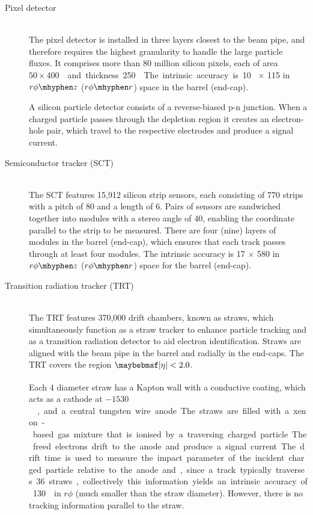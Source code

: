 \begin{description}
\item[Pixel detector] \hfill \\
	The pixel detector is installed in three layers closest to the beam pipe, and 
	therefore requires the highest granularity to handle the large particle fluxes.
	It comprises more than 80 million silicon pixels, each of area 
	\unit{$50 \times 400$}{\micro\metre\squared} and thickness \unit{250}{\micro\metre}. 
	The intrinsic accuracy is \unit{10}{\micro\metre}$\,\times\,$\unit{115}{\micro\metre} 
	in $r\phi \mhyphen z$ ($r\phi \mhyphen r$) space in the barrel (end-cap).

	A silicon particle detector consists of a reverse-biased p-n junction. When a charged
	particle passes through the depletion region it creates an electron-hole pair, which 
	travel to the respective electrodes and produce a signal current.
\item[Semiconductor tracker (SCT)] \hfill \\
	The SCT features 15,912 silicon strip sensors, each consisting of 770 strips 
	with a pitch of \unit{80}{\micro\metre} and a length of \unit{6}{\centi\metre}. Pairs 
	of sensors are sandwiched together into modules with a stereo angle of 
	\unit{40}{\milli\radian}, enabling the coordinate parallel to the strip to be 
	measured. There are four (nine) layers of modules in the barrel (end-cap), which 
	ensures that each track passes through at least four modules. 
	The intrinsic accuracy is \unit{17}{\micro\metre}$\,\times\,$\unit{580}{\micro\metre} 
	in $r\phi \mhyphen z$ ($r\phi \mhyphen r$) space for the barrel (end-cap).
\item[Transition radiation tracker (TRT)] \hfill \\
	The TRT features 370,000 drift chambers, known as straws, which simultaneously 
	function as a straw tracker to enhance particle tracking and as a transition 
	radiation detector to aid electron identification. Straws are aligned with the beam 
	pipe in the barrel and radially in the end-caps. The TRT covers the region 
	$\mods{\eta} < 2.0$.

	Each \unit{4}{\milli\metre} diameter straw has a 
	Kapton\textsuperscript{\circledR}\xspace wall with a conductive coating, which 
	acts as a cathode at \unit{$-1530$}{\volt}, and a central tungsten wire anode. The 
	straws are filled with a xenon-based gas mixture that is ionised by a traversing 
	charged particle. The freed electrons drift to the anode and produce a signal current.
	The drift time is used to measure the impact parameter of the incident charged 
	particle relative to the anode and, since a track typically traverses 36 straws, 
	collectively this information yields an intrinsic accuracy of \unit{130}{\micro\metre}
	in $r\phi$ (much smaller than the straw diameter). However, there is no tracking 
	information parallel to the straw.


\end{description}
